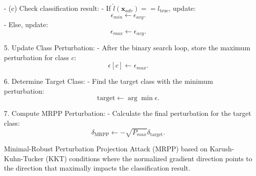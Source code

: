      - (c) Check classification result:
       - If $\hat{l}(\mathbf{x}_{adv}) == l_{\text{true}}$, update:
         \[
         \epsilon_{min} \gets \epsilon_{avg}.
         \]
       - Else, update:
         \[
         \epsilon_{max} \gets \epsilon_{avg}.
         \]

5. Update Class Perturbation:
   - After the binary search loop, store the maximum perturbation for class $c$:
     \[
     \epsilon[c] \gets \epsilon_{max}.
     \]

6. Determine Target Class:
   - Find the target class with the minimum perturbation:
     \[
     \text{target} \gets \arg \min \epsilon.
     \]

7. Compute MRPP Perturbation:
   - Calculate the final perturbation for the target class:
     \[
     \delta_{\text{MRPP}} \gets -\sqrt{P_{max}} \delta_{\text{target}}.
     \]

Minimal-Robust Perturbation Projection Attack (MRPP) based on Karush-Kuhn-Tucker (KKT) conditions where the normalized gradient direction points to the direction that maximally impacts the classification result.
